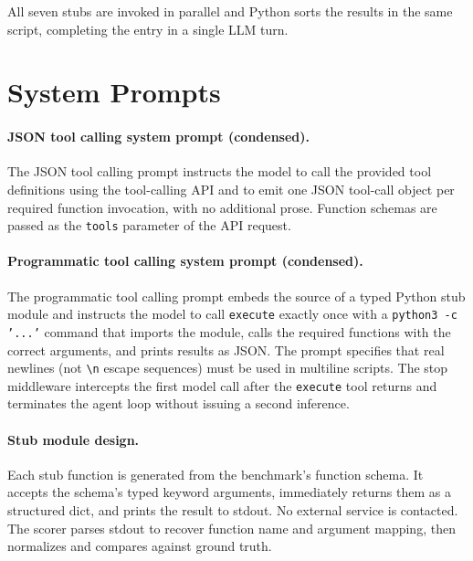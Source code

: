 \documentclass[11pt]{article}
\newcommand{\codemode}{programmatic tool calling}
\newcommand{\Codemode}{Programmatic tool calling}
\newcommand{\execpy}{\texttt{execute}}
\begin{document}
All seven stubs are invoked in parallel and Python sorts the results in the same script,
completing the entry in a single LLM turn.

\section{System Prompts}
\label{app:prompts}

\paragraph{JSON tool calling system prompt (condensed).}
The JSON tool calling prompt instructs the model to call the provided tool definitions
using the tool-calling API and to emit one JSON tool-call object per
required function invocation, with no additional prose.
Function schemas are passed as the \texttt{tools} parameter of the API request.

\paragraph{\Codemode{} system prompt (condensed).}
The \codemode{} prompt embeds the source of a typed Python stub module and
instructs the model to call \execpy{} exactly once with a
\texttt{python3 -c '...'} command that imports the module, calls the required
functions with the correct arguments, and prints results as JSON.
The prompt specifies that real newlines (not \texttt{\textbackslash n} escape
sequences) must be used in multiline scripts.
The stop middleware intercepts the first model call after the \execpy{} tool
returns and terminates the agent loop without issuing a second inference.

\paragraph{Stub module design.}
Each stub function is generated from the benchmark's function schema.
It accepts the schema's typed keyword arguments, immediately returns them as a
structured dict, and prints the result to stdout.
No external service is contacted.
The scorer parses stdout to recover function name and argument mapping, then
normalizes and compares against ground truth.
\end{document}
